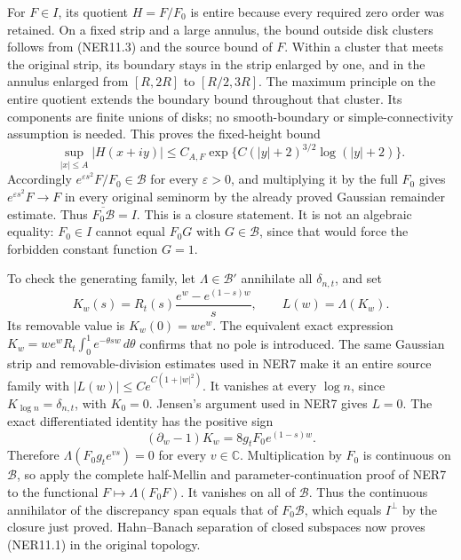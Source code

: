 For \(F\in I\), its quotient \(H=F/F_0\) is entire because every
required zero order was retained. On a fixed strip and a large annulus,
the bound outside disk clusters follows from (NER11.3) and the source
bound of \(F\). Within a cluster that meets the original strip, its
boundary stays in the strip enlarged by one, and in the annulus enlarged
from \([R,2R]\) to \([R/2,3R]\). The maximum principle on the entire
quotient extends the boundary bound throughout that cluster. Its
components are finite unions of disks; no smooth-boundary or
simple-connectivity assumption is needed. This proves the fixed-height
bound \[
\sup_{|x|\le A}|H(x+iy)|
\le C_{A,F}\exp\{C(|y|+2)^{3/2}\log(|y|+2)\}.
\tag{NER11.4}
\] Accordingly \(e^{\varepsilon s^2}F/F_0\in\mathcal B\) for every
\(\varepsilon>0\), and multiplying it by the full \(F_0\) gives
\(e^{\varepsilon s^2}F\to F\) in every original seminorm by the already
proved Gaussian remainder estimate. Thus \(\overline{F_0\mathcal B}=I\).
This is a closure statement. It is not an algebraic equality:
\(F_0\in I\) cannot equal \(F_0G\) with \(G\in\mathcal B\), since that
would force the forbidden constant function \(G=1\).

To check the generating family, let \(\Lambda\in\mathcal B'\) annihilate
all \(\delta_{n,t}\), and set \[
K_w(s)=R_t(s)\frac{e^w-e^{(1-s)w}}s,
\qquad L(w)=\Lambda(K_w).
\tag{NER11.5}
\] Its removable value is \(K_w(0)=we^w\). The equivalent exact
expression \(K_w=we^wR_t\int_0^1e^{-\theta sw}\,d\theta\) confirms that
no pole is introduced. The same Gaussian strip and removable-division
estimates used in NER7 make it an entire source family with
\(|L(w)|\le Ce^{C(1+|w|^2)}\). It vanishes at every \(\log n\), since
\(K_{\log n}=\delta_{n,t}\), with \(K_0=0\). Jensen's argument used in
NER7 gives \(L=0\). The exact differentiated identity has the positive
sign \[
(\partial_w-1)K_w=8g_tF_0e^{(1-s)w}.
\tag{NER11.6}
\] Therefore \(\Lambda(F_0g_te^{vs})=0\) for every \(v\in\mathbb C\).
Multiplication by \(F_0\) is continuous on \(\mathcal B\), so apply the
complete half-Mellin and parameter-continuation proof of NER7 to the
functional \(F\mapsto\Lambda(F_0F)\). It vanishes on all of
\(\mathcal B\). Thus the continuous annihilator of the discrepancy span
equals that of \(F_0\mathcal B\), which equals \(I^\perp\) by the
closure just proved. Hahn--Banach separation of closed subspaces now
proves (NER11.1) in the original topology.

